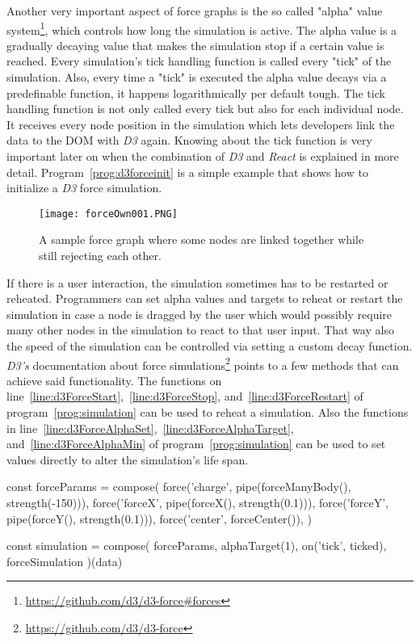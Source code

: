 Another very important aspect of force graphs is the so called "alpha" value system\footnote{\url{https://github.com/d3/d3-force\#forces}}, which controls how long the simulation is active. The alpha value is a gradually decaying value that makes the simulation stop if a certain value is reached. Every simulation's tick handling function is called every "tick" of the simulation. Also, every time a "tick" is executed the alpha value decays via a predefinable function, it happens logarithmically per default tough. The tick handling function is not only called every tick but also for each individual node. It receives every node position in the simulation which lets developers link the data to the DOM with \emph{D3} again. Knowing about the tick function is very important later on when the combination of \emph{D3} and \emph{React} is explained in more detail. Program~\ref{prog:d3forceinit} is a simple example that shows how to initialize a \emph{D3} force simulation.

\begin{figure}
  \centering
  \texttt{[image: forceOwn001.PNG]}
  \caption{A sample force graph where some nodes are linked together while still rejecting each other.}
  \label{fig:force005}
\end{figure}

If there is a user interaction, the simulation sometimes has to be restarted or reheated. Programmers can set alpha values and targets to reheat or restart the simulation in case a node is dragged by the user which would possibly require many other nodes in the simulation to react to that user input. That way also the speed of the simulation can be controlled via setting a custom decay function. \emph{D3's} documentation about force simulations\footnote{\url{https://github.com/d3/d3-force}} points to a few methods that can achieve said functionality. The functions on line~\ref{line:d3ForceStart},~\ref{line:d3ForceStop}, and~\ref{line:d3ForceRestart} of program~\ref{prog:simulation} can be used to reheat a simulation. Also the functions in line~\ref{line:d3ForceAlphaSet},~\ref{line:d3ForceAlphaTarget}, and~\ref{line:d3ForceAlphaMin} of program~\ref{prog:simulation} can be used to set values directly to alter the simulation's life span.

\begin{program}
\caption{\emph{D3} written in a fictional functional way.}
\label{prog:d3functional}
\begin{JsCode}
const forceParams = compose(
  force('charge', pipe(forceManyBody(), strength(-150))),
  force('forceX', pipe(forceX(), strength(0.1))),
  force('forceY', pipe(forceY(), strength(0.1))),
  force('center', forceCenter()),
)

const simulation = compose(
  forceParams,
  alphaTarget(1),
  on('tick', ticked),
  forceSimulation
)(data)
\end{JsCode}
\end{program}

